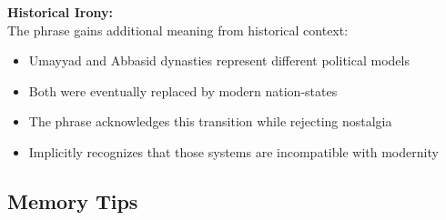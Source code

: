 \documentclass[letterpaper,12pt]{article}
\begin{document}
\begin{tcolorbox}[colback=boxcolor,colframe=accentcolor,title=\textbf{Cultural and Rhetorical Context},breakable]
\textbf{Historical Irony:}\\
The phrase gains additional meaning from historical context:
\begin{itemize}
\item Umayyad and Abbasid dynasties represent different political models
\item Both were eventually replaced by modern nation-states
\item The phrase acknowledges this transition while rejecting nostalgia
\item Implicitly recognizes that those systems are incompatible with modernity
\end{itemize}
\end{tcolorbox}

\subsection{Memory Tips}
\end{document}
